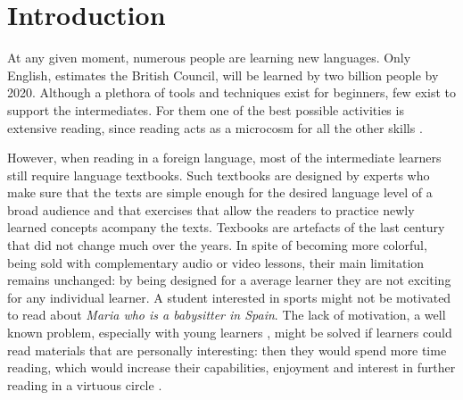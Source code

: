 
\section{Introduction}
At any given moment, numerous people are learning new languages. 
Only English, estimates the British Council, will be learned by two billion people by 2020. 
Although a plethora of tools and techniques exist for beginners, few exist to support the intermediates. For them one of the best possible activities is extensive reading, since reading acts as a microcosm for all the other skills \cite{Day98-Extensive,mccarthy1999-extensive,mccarthy1999-microcosm}. 


However, when reading in a foreign language, most of the intermediate learners still require language textbooks. Such textbooks are designed by experts who make sure that the texts are simple enough for the desired language level of a broad audience and that exercises that allow the readers to practice newly learned concepts acompany the texts. Texbooks are artefacts of the last century that did not change much over the years. In spite of becoming more colorful, being sold with complementary audio or video lessons, their main limitation remains unchanged: 
by being designed for a average learner they are not exciting for any individual learner. A student interested in sports might not be motivated to read about {\em Maria who is a babysitter in Spain}. The lack of motivation, a well known problem, especially with young learners \cite{Hidi00-TheUnmotivated}, might be solved if learners could read materials that are personally interesting: then they would spend more time reading, which would increase their capabilities, enjoyment and interest in further reading in a virtuous circle \cite{Brozo07-Engagement, Guthrie99-Motivation}.

